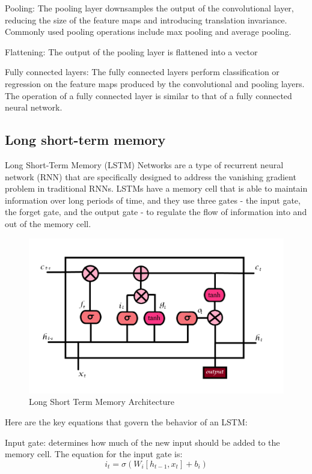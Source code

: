 \documentclass[a4paper]{sapthesis}
\begin{document}
Pooling: The pooling layer downsamples the output of the convolutional 
layer, reducing the size of the feature maps and introducing translation
 invariance. Commonly used pooling operations include max pooling and
  average pooling.\newline

Flattening: The output of the pooling layer is flattened into a vector\newline

Fully connected layers: The fully connected layers perform classification
 or regression on the feature maps produced by the convolutional and
  pooling layers. The operation of a fully connected layer is similar 
  to that of a fully connected neural network.
\subsection{Long short-term memory}
Long Short-Term Memory (LSTM) Networks are a type of recurrent neural 
network (RNN) that are specifically designed to address the vanishing 
gradient problem in traditional RNNs. LSTMs have a memory cell that is
 able to maintain information over long periods of time, and they use 
 three gates - the input gate, the forget gate, and the output gate -
  to regulate the flow of information into and out of the memory cell.
  \begin{figure}[h]
    \includegraphics[scale=0.5]{lstm}
    \centering
    \caption{Long Short Term Memory Architecture}\label{fig:lstm}
    
    \end{figure}
    
Here are the key equations that govern the behavior of an LSTM:

Input gate: determines how much of the new input should be added to the 
memory cell. The equation for the input gate is:
\begin{equation}
  i_t = \sigma(W_i [h_{t-1}, x_t] + b_i)
  \end{equation}
\end{document}
